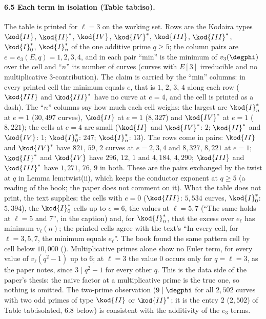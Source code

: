 \begin{sloppypar}
\paragraph{6.5 Each term in isolation (Table tab:iso).} The table is printed for $\ell=3$ on the working set. Rows are the Kodaira types $\kod{II}$, $\kod{II}^*$, $\kod{IV}$, $\kod{IV}^*$, $\kod{III}$,
$\kod{III}^*$, $\kod{I}_0^*$, $\kod{I}_n^*$ of the one additive prime $q\ge5$; the column pairs are $e=e_3(E,q)=1,2,3,4$, and in each pair ``min'' is the minimum of $v_3(\degphi)$ over the cell and ``$n$''
its number of curves (curves with $E[3]$ irreducible and no multiplicative $3$-contribution). The claim is carried by the ``min'' columns: in every printed cell the
minimum equals $e$, that is $1$, $2$, $3$, $4$ along each row ($\kod{III}$ and $\kod{III}^*$ have no curve at $e=4$, and the cell is printed as a dash). The ``$n$'' columns say how much each cell weighs:
the largest are $\kod{I}_n^*$ at $e=1$ ($30{,}497$ curves), $\kod{II}$ at $e=1$ ($8{,}327$) and $\kod{IV}^*$ at $e=1$ ($8{,}221$); the cells at $e=4$ are small ($\kod{II}$ and $\kod{IV}^*$: $2$;
$\kod{II}^*$ and $\kod{IV}$: $1$; $\kod{I}_0^*$: $247$; $\kod{I}_n^*$: $13$). The rows come in pairs: $\kod{II}$ and $\kod{IV}^*$ have $821$, $59$, $2$ curves at $e=2,3,4$ and $8{,}327$, $8{,}221$ at
$e=1$; $\kod{II}^*$ and $\kod{IV}$ have $296$, $12$, $1$ and $4{,}184$, $4{,}290$; $\kod{III}$ and $\kod{III}^*$ have $1{,}271$, $76$, $9$ in both. These are the pairs exchanged by the twist at $q$ in
Lemma lem:twist(ii), which keeps the conductor exponent at $q\ge5$ (a reading of the book; the paper does not comment on it). What the table does not print, the
text supplies: the cells with $e=0$ ($\kod{III}$: $5{,}534$ curves, $\kod{I}_0^*$: $5{,}394$), the $\kod{I}_0^*$ cells up to $e=6$, the values at $\ell=5,7$ (``The same holds at $\ell=5$ and $7$'', in the
caption) and, for $\kod{I}_n^*$, that the excess over $e_\ell$ has minimum $v_\ell(n)$; the printed cells agree with the text's ``In every cell, for $\ell=3,5,7$, the minimum equals
$e_\ell$''. The book found the same pattern cell
by cell below $10{,}000$ (). Multiplicative primes alone show no Euler term, for every value of $v_\ell(q^2-1)$ up to $6$; at $\ell=3$ the value $0$ occurs only for $q=\ell=3$, as
the paper notes, since $3\mid q^2-1$ for every other $q$. This is the data side of the paper's thesis: the naive factor at a multiplicative prime is the true one, so nothing is omitted. The
two-prime observation ($9\mid\degphi$ for all $2{,}502$ curves with two odd primes of type $\kod{II}$ or $\kod{II}^*$; it is the entry $2$ ($2{,}502$) of Table tab:isolated, 6.8 below) is consistent with the additivity of the $e_3$ terms.


\end{sloppypar}
